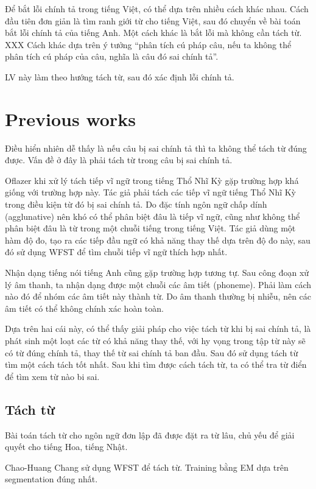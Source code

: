 \documentclass[a4paper]{book}
\begin{document}
Để bắt lỗi chính tả trong tiếng Việt, có thể dựa trên nhiều cách khác
nhau. Cách đầu tiên đơn giản là tìm ranh giới từ cho tiếng Việt, sau
đó chuyển về bài toán bắt lỗi chính tả của tiếng Anh. Một cách khác
là bắt lỗi mà không cần tách từ. XXX
Cách khác dựa trên ý tưởng ``phân tích cú pháp câu, nếu ta không thể
phân tích cú pháp của câu, nghĩa là câu đó sai chính tả''.

LV này làm theo hướng tách từ, sau đó xác định lỗi chính tả.

\section{Previous works}

Điều hiển nhiên dễ thấy là nếu câu bị sai chính tả thì ta không thể
tách từ đúng được. Vấn đề ở đây là phải tách từ trong câu bị sai chính
tả.

Oflazer khi xử lý tách tiếp vĩ ngữ trong tiếng Thổ Nhĩ Kỳ gặp trường
hợp khá giống với trường hợp này. Tác giả phải tách các tiếp vĩ ngữ
tiếng Thổ Nhĩ Kỳ trong điều kiện từ đó bị sai chính tả. Do đặc tính
ngôn ngữ chấp dính (agglunative) nên khó có thể phân biệt đâu là tiếp
vĩ ngữ, cũng như không thể phân biệt đâu là từ trong một chuỗi tiếng
trong tiếng Việt. Tác giả dùng một hàm độ đo, tạo ra các tiếp đầu ngữ
có khả năng thay thế dựa trên độ đo này, sau đó sử dụng WFST để tìm
chuỗi tiếp vĩ ngữ thích hợp nhất.

Nhận dạng tiếng nói tiếng Anh cũng gặp trường hợp tương tự. Sau công
đoạn xử lý âm thanh, ta nhận dạng được một chuỗi các âm tiết
(phoneme). Phải làm cách nào đó để nhóm các âm tiết này thành từ. Do
âm thanh thường bị nhiễu, nên các âm tiết có thể không chính xác hoàn
toàn.

Dựa trên hai cái này, có thể thấy giải pháp cho việc tách từ khi bị
sai chính tả, là phát sinh một loạt các từ có khả năng thay thế, với
hy vọng trong tập từ này sẽ có từ đúng chính tả, thay thế từ sai chính
tả ban đầu. Sau đó sử dụng tách từ tìm một cách tách tốt nhất. Sau khi
tìm được cách tách từ, ta có thể tra từ điển để tìm xem từ nào bi sai.


\subsection{Tách từ}

Bài toán tách từ cho ngôn ngữ đơn lập đã được đặt ra từ lâu, chủ yếu
để giải quyết cho tiếng Hoa, tiếng Nhật. 

Chao-Huang Chang sử dụng WFST để tách từ. Training bằng EM dựa trên
segmentation đúng nhất.
\end{document}
